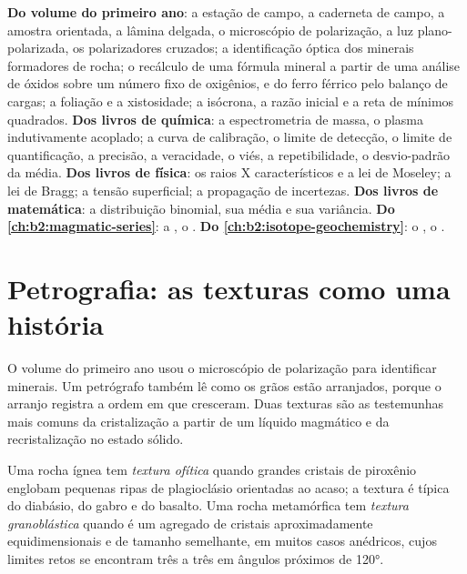 \begin{recall}
\textbf{Do volume do primeiro ano}: a estação de campo, a caderneta de campo, a amostra orientada, a lâmina delgada,
o microscópio de polarização, a luz plano-polarizada, os polarizadores cruzados; a identificação óptica dos minerais
formadores de rocha; o recálculo de uma fórmula mineral a partir de uma análise de óxidos sobre um número fixo de oxigênios,
e do ferro férrico pelo balanço de cargas; a foliação e a xistosidade; a isócrona, a razão inicial e a
reta de mínimos quadrados. \textbf{Dos livros de química}: a espectrometria de massa, o plasma indutivamente acoplado;
a curva de calibração, o limite de detecção, o limite de quantificação, a precisão, a veracidade, o viés,
a repetibilidade, o desvio-padrão da média. \textbf{Dos livros de física}: os raios X característicos
e a lei de Moseley; a lei de Bragg; a tensão superficial; a propagação de incertezas.
\textbf{Dos livros de matemática}: a distribuição binomial, sua média e sua variância.
\textbf{Do \cref{ch:b2:magmatic-series}}: a , o .
\textbf{Do \cref{ch:b2:isotope-geochemistry}}: o , o .
\end{recall}

\section{Petrografia: as texturas como uma história}\label{sec:b2:field-lab-methods-2:petrography}

O volume do primeiro ano usou o microscópio de polarização para identificar minerais. Um petrógrafo também lê
como os grãos estão arranjados, porque o arranjo registra a ordem em que cresceram. Duas
texturas são as testemunhas mais comuns da cristalização a partir de um líquido magmático e da recristalização no
estado sólido.

\begin{definition}\label{def:b2:field-lab-methods-2:textures}
Uma rocha ígnea tem \emph{textura ofítica} quando grandes cristais de piroxênio
englobam pequenas ripas de plagioclásio orientadas ao acaso; a textura é típica do diabásio, do gabro
e do basalto. Uma rocha metamórfica tem \emph{textura granoblástica} quando
é um agregado de cristais aproximadamente equidimensionais e de tamanho semelhante, em muitos casos anédricos,
cujos limites retos se encontram três a três em ângulos próximos de \ang{120}.
\end{definition}

